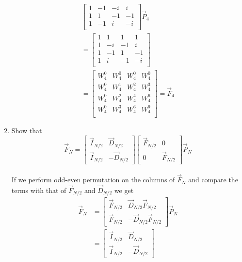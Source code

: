 \documentclass[journal,12pt,twocolumn]{IEEEtran}
\renewcommand\thesection{\arabic{section}}
\begin{document}
\begin{enumerate}[label=\arabic*.,ref=\thesection.\theenumi]
\begin{align}
\begin{bmatrix}
			1	&	-1	&	-i	&	i\\
			1	&	1	&	-1	&	-1\\
			1	&	-1	&	i	&	-i\\
		\end{bmatrix}\vec{P}_{4}\\
		=\begin{bmatrix}
			1	&	1	&	1	&	1\\
			1	&	-i	&	-1	&	i\\
			1	&	-1	&	1	&	-1\\
			1	&	i	&	-1	&	-i\\
		\end{bmatrix}\\
		= \begin{bmatrix}
			W_{4}^0	&	W_{4}^0	&	W_{4}^0	&	W_{4}^0\\
			W_{4}^0	&	W_{4}^1	&	W_{4}^2	&	W_{4}^3\\
			W_{4}^0	&	W_{4}^2	&	W_{4}^4	&	W_{4}^6\\
			W_{4}^0	&	W_{4}^3	&	W_{4}^6	&	W_{4}^9\\
		\end{bmatrix} = \vec{F}_{4}
	\end{align}
	\item Show that 
	\begin{equation}
		\vec{F}_{N}=
		\begin{bmatrix}
			\vec{I}_{N/2} & \vec{D}_{N/2} \\
			\vec{I}_{N/2} & -\vec{D}_{N/2}
		\end{bmatrix}
		\begin{bmatrix}
			\vec{F}_{N/2} & 0 \\
			0 & \vec{F}_{N/2}
		\end{bmatrix}
		\vec{P}_{N}
	\end{equation}
	\solution\\
	If we perform odd-even permutation on the columns of $\vec{F}_{N}$ and compare the terms with that of $\vec{F}_{N/2}$ and $\vec{D}_{N/2}$ we get
	\begin{align}
		\vec{F}_{N}&=
		\begin{bmatrix}
			\vec{F}_{N/2} & \vec{D}_{N/2}\vec{F}_{N/2} \\
			\vec{F}_{N/2} & -\vec{D}_{N/2}\vec{F}_{N/2}
		\end{bmatrix}
		\vec{P}_{N}\\
		&=\begin{bmatrix}
			\vec{I}_{N/2} & \vec{D}_{N/2} \\
			\vec{I}_{N/2} & -\vec{D}_{N/2}
		\end{bmatrix}

\end{align}
\end{enumerate}
\end{document}
